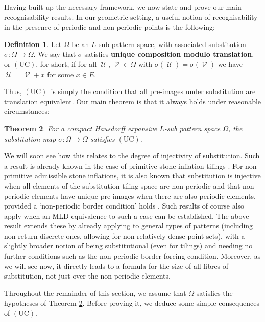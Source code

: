 \documentclass[11pt]{amsart}
\numberwithin{equation}{section}
\theoremstyle{plain}
\newtheorem{theorem}{Theorem}[section]
\theoremstyle{definition}
\newtheorem{definition}[theorem]{Definition}
\newcommand{\sub}{\sigma}
\DeclareMathOperator{\cU}{\mathcal{U}}
\DeclareMathOperator{\cV}{\mathcal{V}}
\newcommand{\UC}{\(\mathrm{(UC)}\)}
\begin{document}
Having built up the necessary framework, we now state and prove our main recognisability results. In our geometric setting, a useful notion of recognisability in the presence of periodic and non-periodic points is the following:

\begin{definition}
Let \(\Omega\) be an \(L\)-sub pattern space, with associated substitution \(\sub \colon \Omega \to \Omega\). We say that \(\sub\) satisfies \textbf{unique composition modulo translation}, or \UC, for short, if for all \(\cU\), \(\cV \in \Omega\) with \(\sub(\cU) = \sub(\cV)\) we have \(\cU = \cV + x\) for some \(x \in E\).
\end{definition}

Thus, \UC\ is simply the condition that all pre-images under substitution are translation equivalent. Our main theorem is that it always holds under reasonable circumstances:

\begin{theorem}\label{thm:recognisability}
For a compact Hausdorff expansive \(L\)-sub pattern space \(\Omega\), the substitution map \(\sub \colon \Omega \to \Omega\) satisfies \UC.
\end{theorem}

We will soon see how this relates to the degree of injectivity of substitution. Such a result is already known in the case of primitive stone inflation tilings \cite{Sol98}. For non-primitive admissible stone inflations, it is also known that substitution is injective when all elements of the substitution tiling space are non-periodic and that non-periodic elements have unique pre-images when there are also periodic elements, provided a `non-periodic border condition' holds \cite{CS11}. Such results of course also apply when an MLD equivalence to such a case can be established. The above result extends these by already applying to general types of patterns (including non-return discrete ones, allowing for non-relatively dense point sets), with a slightly broader notion of being substitutional (even for tilings) and needing no further conditions such as the non-periodic border forcing condition. Moreover, as we will see now, it directly leads to a formula for the size of all fibres of substitution, not just over the non-periodic elements.

Throughout the remainder of this section, we assume that \(\Omega\) satisfies the hypotheses of Theorem \ref{thm:recognisability}. Before proving it, we deduce some simple consequences of \UC.
\end{document}
